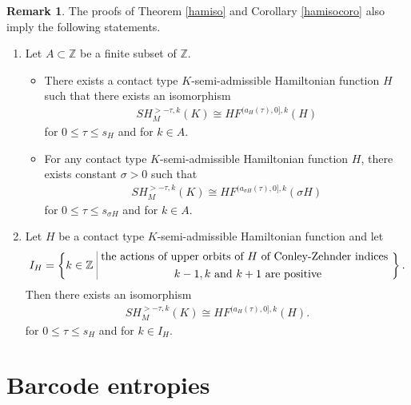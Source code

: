 \documentclass[12pt]{amsart}
\def\bigmid{\ \rule[-3.5mm]{0.1mm}{9mm}\ }
\theoremstyle{definition}
\newtheorem{remark}[theorem]{Remark}
\newcommand{\ZZ}{{\mathbb Z}}
\begin{document}
\begin{remark}\label{rmk1}
The proofs of Theorem \ref{hamiso} and Corollary \ref{hamisocoro} also imply the following statements.
\begin{enumerate}[label=(\alph*)]
    \item Let $A \subset \ZZ$ be a finite subset of $\ZZ$. \vspace{0.2cm}
    \begin{itemize}
       \item There exists a contact type $K$-semi-admissible Hamiltonian function $H$ such that there exists an isomorphism
    \begin{align*}
        SH^{>-\tau,k}_M(K) \cong HF^{(a_{H}(\tau),0],k}(H)
    \end{align*}
    for $0 \leq \tau \leq s_H$ and for $k \in A$. \vspace{0.2cm}
    \item For any contact type $K$-semi-admissible Hamiltonian function $H$, there exists constant $\sigma >0$ such that
    \begin{align*}
         SH^{>-\tau,k}_M(K) \cong HF^{(a_{\sigma H}(\tau),0],k}(\sigma H)
    \end{align*}
    for $0 \leq \tau \leq s_{\sigma H}$ and for $k \in A$.\vspace{0.2cm}
    \end{itemize}
    \item Let $H$ be a contact type $K$-semi-admissible Hamiltonian function and let
    \begin{align*}
        I_H = \left\{ k \in \ZZ \bigmid \substack{ \textstyle \text{the actions of upper orbits of } H \text{ of Conley-Zehnder indices } $\vspace{0.2cm}$\\ 
             \,\,\textstyle k-1, k \text{ and } k+1 \text{ are positive}} \right\}.
    \end{align*}
    Then there exists an isomorphism 
    \begin{align*}
        SH_M^{>-\tau,k}(K) \cong HF^{(a_{H}(\tau),0],k}(H).
    \end{align*}
    for $0\leq\tau\leq s_H$ and for $k \in I_H$.
   \end{enumerate}
       \end{remark}


\vspace{0.2cm}  

\section{Barcode entropies}
\end{document}
